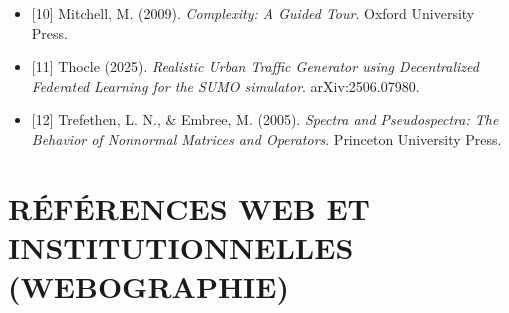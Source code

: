 \documentclass[10pt, a4paper]{article}
\begin{document}
\begin{itemize}
{  Differenzengleichungen, die partielle Differentialgleichungen
  approximieren}. BIT Numerical Mathematics, 2(3), 153-181.
\item
  {[}10{]} Mitchell, M. (2009). \emph{Complexity: A Guided Tour}. Oxford
  University Press.
\item
  {[}11{]} Thocle (2025). \emph{Realistic Urban Traffic Generator using
  Decentralized Federated Learning for the SUMO simulator}.
  arXiv:2506.07980.
\item
  {[}12{]} Trefethen, L. N., \& Embree, M. (2005). \emph{Spectra and
  Pseudospectra: The Behavior of Nonnormal Matrices and Operators}.
  Princeton University Press.
\end{itemize}

\newpage

\section{RÉFÉRENCES WEB ET INSTITUTIONNELLES
(WEBOGRAPHIE)}\label{ruxe9fuxe9rences-web-et-institutionnelles-webographie}
\end{document}
